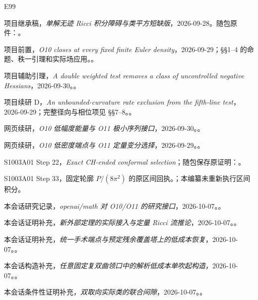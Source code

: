 \documentclass[UTF8,11pt,openany,fontset=none]{ctexbook}
\theoremstyle{definition}
\theoremstyle{remark}
\begin{document}
\begin{thebibliography}{E99}
\small
{} 项目继承稿，\emph{单解无迹 Ricci 积分障碍与类平方短缺版}，2026-09-28。随包原件：。

 项目前置，\emph{O10 closes at every fixed finite Euler density}，2026-09-29；§§1--4 的命题、秩一引理和实际场应用。。

 项目辅助引理，\emph{A double weighted test removes a class of uncontrolled negative Hessians}，2026-09-30。。

 项目续研 D，\emph{An unbounded-curvature rate exclusion from the fifth-line test}，2026-09-29；完整径向与相位项见 §§7--8。。

 网页续研，\emph{O10 低幅度能量与 O11 极小序列接口}，2026-09-30。。

 网页续研，\emph{O10 低密度端点与 O11 定量变分选择}，2026-09-29。。

 S1003A01 Step 22，\emph{Exact CH-ended conformal selection}；随包保存原证明：。

 S1003A01 Step 33，固定轮廓 \(P/(8\pi^2)\) 的原区间回执。；本编纂未重新执行区间积分。

 本会话研究记录，\emph{openai/math 对 O10/O11 的研究接口}，2026-10-07。。

 本会话证明补充，\emph{新外部定理的实际接入与定量 Ricci 流推论}，2026-10-07。。

 本会话证明补充，\emph{统一手术端点与预定残余覆盖塔上的低成本恢复}，2026-10-07。。

 本会话构造补充，\emph{任意固定复双曲领口中的解析低成本单吹起构造}，2026-10-07。。

 本会话条件性证明补充，\emph{双取向实际类的联合间隙}，2026-10-07。。


\end{thebibliography}
\end{document}
